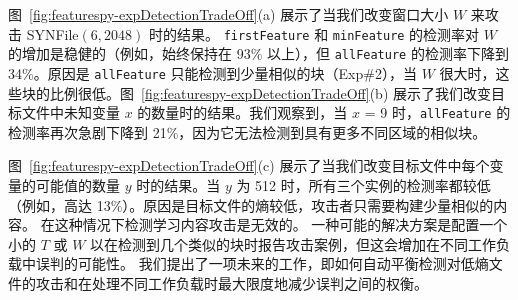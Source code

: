 图~\ref{fig:featurespy-expDetectionTradeOff}(a) 展示了当我们改变窗口大小 $W$ 来攻击 SYNFile$(6, 2048)$ 时的结果。 {\tt firstFeature} 和 {\tt minFeature} 的检测率对 $W$ 的增加是稳健的（例如，始终保持在 93\% 以上），但 {\tt allFeature} 的检测率下降到 34\%。原因是 {\tt allFeature} 只能检测到少量相似的块（Exp\#2），当 $W$ 很大时，这些块的比例很低。图~\ref{fig:featurespy-expDetectionTradeOff}(b) 展示了我们改变目标文件中未知变量 $x$ 的数量时的结果。我们观察到，当 $x$ = 9 时，{\tt allFeature} 的检测率再次急剧下降到 21\%，因为它无法检测到具有更多不同区域的相似块。


图~\ref{fig:featurespy-expDetectionTradeOff}(c) 展示了当我们改变目标文件中每个变量的可能值的数量 $y$ 时的结果。当 $y$ 为 512 时，所有三个实例的检测率都较低（例如，高达 13\%）。原因是目标文件的熵较低，攻击者只需要构建少量相似的内容。 \sysnameF 在这种情况下检测学习内容攻击是无效的。 一种可能的解决方案是配置一个小的 $T$ 或 $W$ 以在检测到几个类似的块时报告攻击案例，但这会增加在不同工作负载中误判的可能性。 我们提出了一项未来的工作，即如何自动平衡检测对低熵文件的攻击和在处理不同工作负载时最大限度地减少误判之间的权衡。